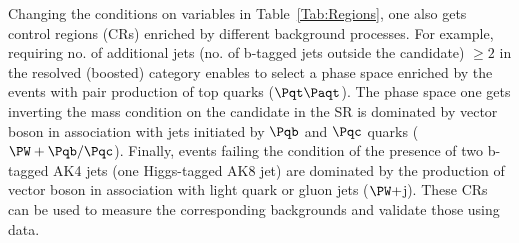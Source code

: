 \documentclass[a4paper,11pt]{article}
\newcommand{\Pb}{{{\Pqb}}\xspace}
\newcommand{\Pt}{{{\Pqt}}\xspace}
\newcommand{\Pc}{{{\Pqc}}\xspace}
\newcommand{\PAt}{{{{\Paqt}}}\xspace}
\begin{document}
Changing the conditions on variables in  Table~\ref{Tab:Regions}, one also gets control regions (CRs) enriched by different background processes. 
For example, requiring no. of additional jets (no. of b-tagged jets outside the \PH candidate) $\geq 2$ in the resolved (boosted) category enables to select a phase space enriched by the events with pair production of top quarks ($\Pt\PAt$).
The phase space one gets inverting the mass condition on the \PH candidate in the SR is dominated by vector boson in association with jets initiated by $\Pb$ and $\Pc$ quarks (${\PW}+\Pb/\Pc$). 
Finally, events failing the condition of the presence of two b-tagged AK4 jets (one Higgs-tagged AK8 jet) are dominated by the production of vector boson in association with light quark or gluon jets (${\PW}+$j).
These CRs can be used to measure the corresponding backgrounds and validate those using data.
\end{document}
